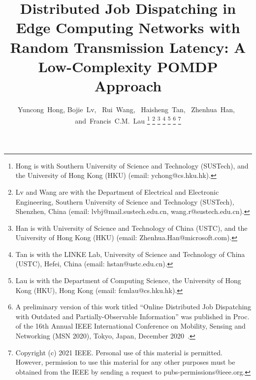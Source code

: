 \documentclass[journal]{IEEEtran} %
\theoremstyle{definition}             %
\theoremstyle{remark}                 %
\theoremstyle{plain}                  %
\newcommand{\hongyc}[1]{{\leavevmode\color{purple}#1}}
\begin{document}
    \title{Distributed Job Dispatching in Edge Computing Networks with Random Transmission Latency: A Low-Complexity POMDP Approach
    }
    
    \author{
        Yuncong~Hong,
        Bojie~Lv,~
        Rui~Wang,~
        Haisheng~Tan,~
        Zhenhua~Han,~
        and~Francis~C.M.~Lau%
        \thanks{
          Hong is with Southern University of Science and Technology (SUSTech), and the University of Hong Kong (HKU) (email: ychong@cs.hku.hk).
        }
        \thanks{
          Lv and Wang are with the Department of Electrical and Electronic Engineering, Southern University of Science and Technology (SUSTech), Shenzhen, China (email: lvbj@mail.sustech.edu.cn, wang.r@sustech.edu.cn).
        }
        \thanks{
          Han is with University of Science and Technology of China (USTC), and the University of Hong Kong (HKU) (email: Zhenhua.Han@microsoft.com).
        }%
        \thanks{
          Tan is with the LINKE Lab,  University of Science and Technology of China (USTC), Hefei, China (email: hstan@ustc.edu.cn).
        }%
        \thanks{
          Lau is with the Department of Computing Science, the University of Hong Kong (HKU), Hong Kong (email: fcmlau@cs.hku.hk).
        }%
        \thanks{
          A preliminary version of this work titled ``Online Distributed Job Dispatching with Outdated and Partially-Observable Information'' was published in Proc. of the 16th Annual IEEE International Conference on Mobility, Sensing and Networking (MSN 2020), Tokyo, Japan, December 2020~\cite{msn2020}.
        }%
        \thanks{\hongyc{
          Copyright (c) 2021 IEEE. Personal use of this material is permitted. However, permission to use this material for any other purposes must be obtained from the IEEE by sending a request to pubs-permissions@ieee.org.
        }}%
    }%

    \maketitle
    

    

    
    

    
    
    
\end{document}
